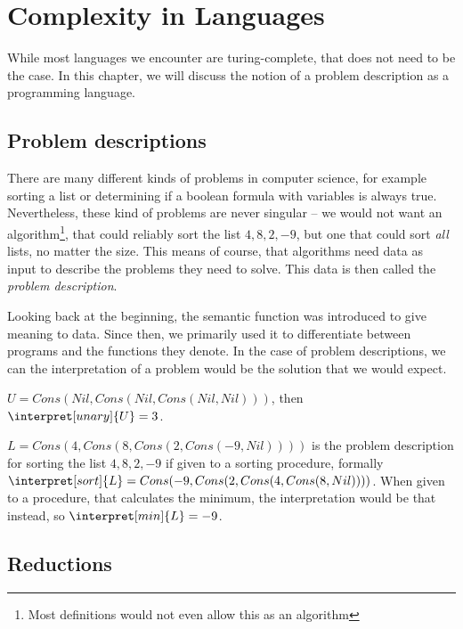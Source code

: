 \section{Complexity in Languages}
\label{sec:complexity}
While most languages we encounter are turing-complete, that does not need
to be the case. In this chapter, we will discuss the notion of a problem 
description as a programming language.

\subsection{Problem descriptions}
There are many different kinds of problems in computer science, for example 
sorting a list or determining if a boolean formula with variables is always
true. Nevertheless, these kind of problems are never singular -- we would not 
want an algorithm\footnote{Most definitions would not even allow this as an 
algorithm}, that could reliably sort the list $4, 8, 2, -9$, but one that 
could sort {\em all} lists, no matter the size. This means of course, that 
algorithms need data as input to describe the problems they need to solve. 
This data is then called the {\em problem description}. 

Looking back at the beginning, the semantic function was introduced to give 
meaning to data. Since then, we primarily used it to differentiate between 
\WHILE programs and the functions they denote. In the case of problem
descriptions, we can the interpretation of a problem would be the solution 
that we would expect. 

\begin{example}
	$U = Cons(Nil, Cons(Nil, Cons(Nil, Nil)))$, then $\interpret[unary]{U} = 3$.
\end{example}
\begin{example}
	$L=Cons(4, Cons(8, Cons(2, Cons(-9, Nil))))$ is the problem description for
	sorting the list $4, 8, 2, -9$ if given to a sorting procedure, formally
	$\interpret[sort]{L}= Cons(-9, Cons(2, Cons(4, Cons(8, Nil))))$. When given
	to a procedure, that calculates the minimum, the interpretation would be that
	instead, so $\interpret[min]{L} = -9$.
\end{example}

\TODO
\subsection{Reductions}
\TODO

